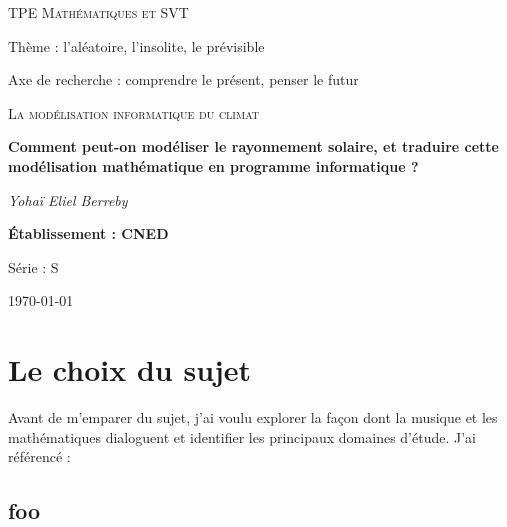 \documentclass[12pt,a4paper]{article}
\begin{document}
\begin{titlepage}
	\centering
	
	{\scshape\Large TPE Mathématiques et SVT\par}
	\vspace{0.2cm}	
	Thème : l'aléatoire, l'insolite, le prévisible\par
	Axe de recherche : comprendre le présent, penser le futur\par
	\vspace{1.5cm}

	{\scshape\LARGE La modélisation informatique du climat \par}
	\vspace{1cm}
	{\huge\bfseries Comment peut-on modéliser le rayonnement solaire, et traduire cette modélisation mathématique en programme informatique ?\par}

	\vspace{1cm}
	{\Large\itshape Yohaï Eliel Berreby\par}
	
	\vfill
	
	
	{\Large\bfseries Établissement : CNED\par
	Série : S }

	\vfill

	{\large \today\par}
\end{titlepage}


\section{Le choix du sujet}

Avant de m’emparer du sujet, j’ai voulu explorer la façon dont la musique et les
mathématiques dialoguent et identifier les principaux domaines d’étude. J’ai
référencé :

\subsection{foo}
\end{document}

